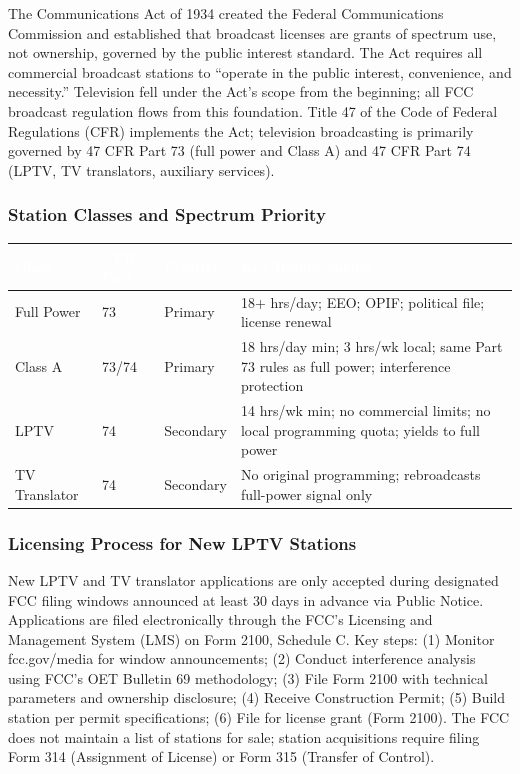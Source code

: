 \documentclass[11pt,letterpaper]{article}
\newcommand{\tableheader}[1]{\textbf{\sffamily\textcolor{white}{#1}}}
\begin{document}
The Communications Act of 1934 created the Federal Communications Commission and established that broadcast licenses are grants of spectrum use, not ownership, governed by the public interest standard. The Act requires all commercial broadcast stations to ``operate in the public interest, convenience, and necessity.'' Television fell under the Act's scope from the beginning; all FCC broadcast regulation flows from this foundation. Title 47 of the Code of Federal Regulations (CFR) implements the Act; television broadcasting is primarily governed by 47 CFR Part 73 (full power and Class A) and 47 CFR Part 74 (LPTV, TV translators, auxiliary services).

\subsubsection{Station Classes and Spectrum Priority}

\begin{center}
\begin{tabularx}{\textwidth}{L{2.5cm}L{2cm}L{2.5cm}X}
\toprule
{}
\tableheader{Class} & \tableheader{CFR Part} & \tableheader{Priority} & \tableheader{Key Requirements} \\
\midrule
Full Power & 73 & Primary & 18+ hrs/day; EEO; OPIF; political file; license renewal \\
Class A & 73/74 & Primary & 18 hrs/day min; 3 hrs/wk local; same Part 73 rules as full power; interference protection \\
LPTV & 74 & Secondary & 14 hrs/wk min; no commercial limits; no local programming quota; yields to full power \\
TV Translator & 74 & Secondary & No original programming; rebroadcasts full-power signal only \\
\bottomrule
\end{tabularx}
\end{center}

\subsubsection{Licensing Process for New LPTV Stations}

New LPTV and TV translator applications are only accepted during designated FCC filing windows announced at least 30 days in advance via Public Notice. Applications are filed electronically through the FCC's Licensing and Management System (LMS) on Form 2100, Schedule C. Key steps: (1) Monitor fcc.gov/media for window announcements; (2) Conduct interference analysis using FCC's OET Bulletin 69 methodology; (3) File Form 2100 with technical parameters and ownership disclosure; (4) Receive Construction Permit; (5) Build station per permit specifications; (6) File for license grant (Form 2100). The FCC does not maintain a list of stations for sale; station acquisitions require filing Form 314 (Assignment of License) or Form 315 (Transfer of Control).
\end{document}
